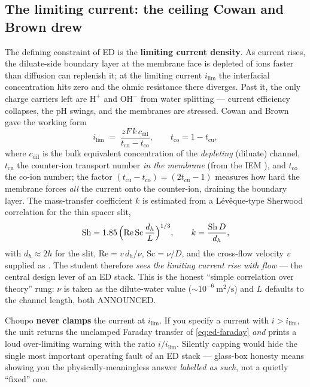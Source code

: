 \documentclass[11pt,a4paper]{article}
\begin{document}
\subsection{The limiting current: the ceiling Cowan and Brown drew}

The defining constraint of ED is the \textbf{limiting current density}.
As current rises, the diluate-side boundary layer at the membrane face is
depleted of ions faster than diffusion can replenish it; at the limiting
current $i_\text{lim}$ the interfacial concentration hits zero and the
ohmic resistance there diverges.  Past it, the only charge carriers left
are $\mathrm{H^+}$ and $\mathrm{OH^-}$ from water splitting --- current
efficiency collapses, the pH swings, and the membranes are stressed.
Cowan and Brown \cite{CowanBrown1959} gave the working form
%
\begin{equation}
  i_\text{lim} \;=\; \frac{z F\,k\,c_\text{dil}}{t_\text{cu} - t_\text{co}},
  \qquad t_\text{co} = 1 - t_\text{cu},
  \label{eq:ed-ilim}
\end{equation}
%
where $c_\text{dil}$ is the bulk equivalent concentration of the
\emph{depleting} (diluate) channel, $t_\text{cu}$ the counter-ion
transport number \emph{in the membrane} (from the IEM ), and
$t_\text{co}$ the co-ion number; the factor $(t_\text{cu}-t_\text{co}) =
(2t_\text{cu}-1)$ measures how hard the membrane forces \emph{all} the
current onto the counter-ion, draining the boundary layer.  The
mass-transfer coefficient $k$ is estimated from a L\'ev\^eque-type
Sherwood correlation for the thin spacer slit,
%
\begin{equation}
  \mathrm{Sh} = 1.85\,
    \Bigl(\mathrm{Re}\,\mathrm{Sc}\,\frac{d_h}{L}\Bigr)^{1/3},
  \qquad k = \frac{\mathrm{Sh}\,D}{d_h},
  \label{eq:ed-leveque}
\end{equation}
%
with $d_h \approx 2h$ for the slit, $\mathrm{Re} = v\,d_h/\nu$,
$\mathrm{Sc} = \nu/D$, and the cross-flow velocity $v$ supplied as
.  The student therefore \emph{sees the limiting
current rise with flow} --- the central design lever of an ED stack.  This
is the honest ``simple correlation over theory'' rung: $\nu$ is taken as
the dilute-water value ($\sim\!10^{-6}\ \mathrm{m^2/s}$) and $L$ defaults
to the channel length, both ANNOUNCED.

\begin{pitfall}
Choupo \textbf{never clamps} the current at $i_\text{lim}$.  If you
specify a current with $i > i_\text{lim}$, the unit returns the unclamped
Faraday transfer of \eqref{eq:ed-faraday} \emph{and} prints a loud
over-limiting warning with the ratio $i/i_\text{lim}$.  Silently capping
would hide the single most important operating fault of an ED stack ---
glass-box honesty means showing you the physically-meaningless answer
\emph{labelled as such}, not a quietly ``fixed'' one.
\end{pitfall}
\end{document}
